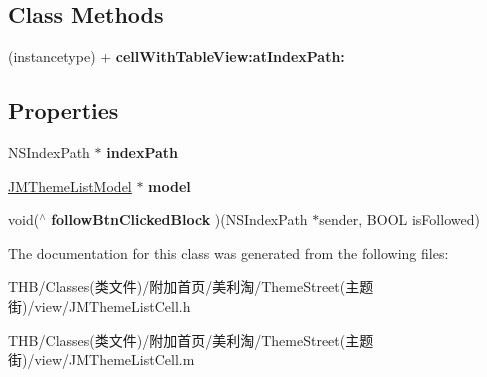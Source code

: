 \subsection*{Class Methods}
\begin{DoxyCompactItemize}
\item 
\mbox{\label{interface_j_m_theme_list_cell_a9894a3ecbee00d552da4fef9c5d49c35}} 
(instancetype) + {\bfseries cell\+With\+Table\+View\+:at\+Index\+Path\+:}
\end{DoxyCompactItemize}
\subsection*{Properties}
\begin{DoxyCompactItemize}
\item 
\mbox{\label{interface_j_m_theme_list_cell_a691dc75691b05ea69fe78f62f585304d}} 
N\+S\+Index\+Path $\ast$ {\bfseries index\+Path}
\item 
\mbox{\label{interface_j_m_theme_list_cell_a9692882408f55de7b930da3ce2735577}} 
\mbox{\hyperlink{interface_j_m_theme_list_model}{J\+M\+Theme\+List\+Model}} $\ast$ {\bfseries model}
\item 
\mbox{\label{interface_j_m_theme_list_cell_a06be1d6ebac44c05870323f7188ce14e}} 
void($^\wedge$ {\bfseries follow\+Btn\+Clicked\+Block} )(N\+S\+Index\+Path $\ast$sender, B\+O\+OL is\+Followed)
\end{DoxyCompactItemize}


The documentation for this class was generated from the following files\+:\begin{DoxyCompactItemize}
\item 
T\+H\+B/\+Classes(类文件)/附加首页/美利淘/\+Theme\+Street(主题街)/view/J\+M\+Theme\+List\+Cell.\+h\item 
T\+H\+B/\+Classes(类文件)/附加首页/美利淘/\+Theme\+Street(主题街)/view/J\+M\+Theme\+List\+Cell.\+m\end{DoxyCompactItemize}
